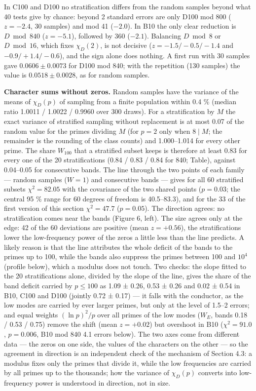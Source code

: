 \documentclass[
  10pt,
]{article}
\begin{document}
In C100 and D100 no stratification differs from the random samples
beyond what 40 tests give by chance: beyond 2 standard errors are only
D100 mod 800 (\(z = -2.4\), 30 samples) and mod 41 (\(-2.0\)). In B10
the only clear reduction is \(D \bmod 840\) (\(z = -5.1\)), followed by
360 (\(-2.1\)). Balancing \(D \bmod 8\) or \(D \bmod 16\), which fixes
\(\chi_D(2)\), is not decisive (\(z = -1.5 / -0.5 / -1.4\) and
\(-0.9 / +1.4 / -0.6\)), and the sign alone does nothing. A first run
with 30 samples gave \(0.0606 \pm 0.0073\) for D100 mod 840; with the
repetition (130 samples) the value is \(0.0518 \pm 0.0028\), as for
random samples.

\textbf{Character sums without zeros.} Random samples have the variance
of the means of \(\chi_D(p)\) of sampling from a finite population
within 0.4 \% (median ratio 1.0011 / 1.0022 / 0.9960 over 300 draws).
For a stratification by \(M\) the exact variance of stratified sampling
without replacement is at most 0.07 of the random value for the primes
dividing \(M\) (for \(p = 2\) only when \(8 \mid M\); the remainder is
the rounding of the class counts) and 1.000--1.014 for every other
prime. The share \(W_{100}\) that a stratified subset keeps is therefore
at least 0.83 for every one of the 20 stratifications (0.84 / 0.83 /
0.84 for 840; Table), against 0.04--0.05 for consecutive bands. The line
through the two points of each family --- random samples (\(W = 1\)) and
consecutive bands --- gives for all 60 stratified subsets
\(\chi^2 = 82.05\) with the covariance of the two shared points
(\(p = 0.03\); the central 95 \% range for 60 degrees of freedom is
40.5--83.3), and for the 33 of the first version of this section
\(\chi^2 = 47.7\) (\(p = 0.05\)). The direction agrees: no
stratification comes near the bands (Figure 6, left). The size agrees
only at the edge: 42 of the 60 deviations are positive (mean
\(z = +0.56\)), the stratifications lower the low-frequency power of the
zeros a little less than the line predicts. A likely reason is that the
line attributes the whole deficit of the bands to the primes up to 100,
while the bands also suppress the primes between 100 and \(10^4\)
(profile below), which a modulus does not touch. Two checks: the slope
fitted to the 20 stratifications alone, divided by the slope of the
line, gives the share of the band deficit carried by \(p \le 100\) as
1.09 ± 0.26, 0.53 ± 0.26 and 0.02 ± 0.54 in B10, C100 and D100 (jointly
0.72 ± 0.17) --- it falls with the conductor, as the low modes are
carried by ever larger primes, but only at the level of 1.5--2 errors;
and equal weights \((\ln p)^2/p\) over all primes of the low modes
(\(W_E\), bands 0.18 / 0.53 / 0.75) remove the shift (mean
\(z = +0.02\)) but overshoot in B10 (\(\chi^2 = 91.0\), \(p = 0.006\),
B10 mod 840 4.1 errors below). The two axes come from different data ---
the zeros on one side, the values of the characters on the other --- so
the agreement in direction is an independent check of the mechanism of
Section 4.3: a modulus fixes only the primes that divide it, while the
low frequencies are carried by all primes up to the thousands; how the
variance of \(\chi_D(p)\) converts into low-frequency power is
understood in direction, not in size.
\end{document}
